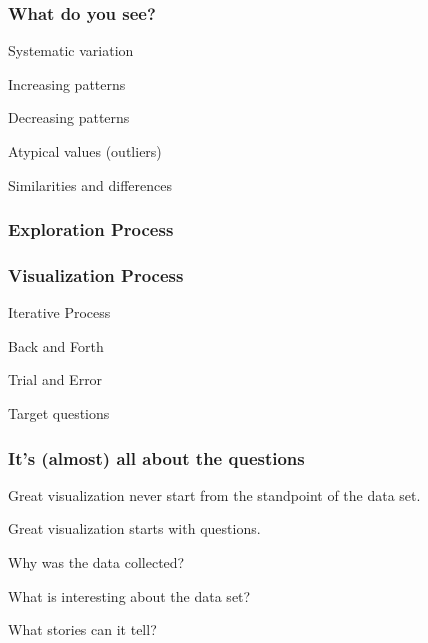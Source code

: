 \documentclass[12pt]{beamer}\usepackage[]{graphicx}\usepackage[]{color}
\begin{document}
\begin{frame}
\frametitle{What do you see?}

\bi
  \item Systematic variation
  \item Increasing patterns
  \item Decreasing patterns
  \item Atypical values (outliers)
  \item Similarities and differences
\ei
\eb

\end{frame}


\begin{frame}[fragile]
\frametitle{Exploration Process}
\begin{center}
\end{center}
\end{frame}


\begin{frame}
\frametitle{Visualization Process}

\bi
  \item Iterative Process
  \item Back and Forth
  \item Trial and Error
  \item Target questions
\ei

\end{frame}


\begin{frame}
\begin{center}
\Huge{}
\end{center}
\end{frame}


\begin{frame}
\frametitle{It's (almost) all about the questions}

\bbi
  \item Great visualization never start from the standpoint of the data set.
  \item Great visualization starts with questions.
  \item Why was the data collected?
  \item What is interesting about the data set?
  \item What stories can it tell?
\ei

\end{frame}
\end{document}

